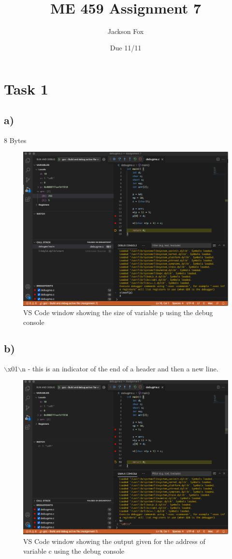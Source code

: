 \documentclass[11pt, oneside]{article}   	%
\title{ME 459 Assignment 7}
\author{Jackson Fox}
\date{Due 11/11}							%
\begin{document}
\maketitle
\section*{Task 1}
\subsection*{a)}
8 Bytes
		\begin{figure} [h]
			\centering
			\includegraphics[width=125 mm]{Task1A.png}
			\caption{VS Code window showing the size of variable p using the debug console}
		\end{figure}
		\newpage	
\subsection*{b)}
$\backslash$x01$\backslash$n - this is an indicator of the end of a header and then a new line.
	
		\begin{figure} [h]
			\centering
			\includegraphics[width=125 mm]{Task1B.png}
			\caption{VS Code window showing the output given for the address of variable c using the debug console}
		\end{figure}
\newpage
\end{document}
